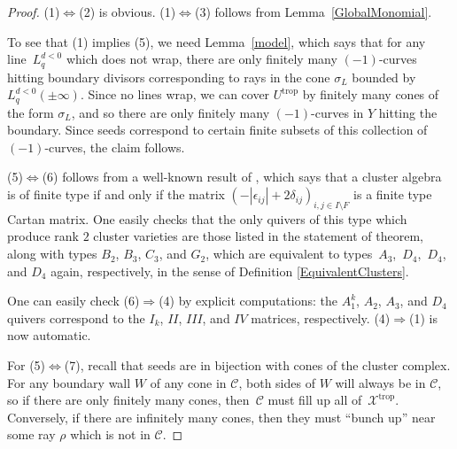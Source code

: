 \documentclass[10pt,a4paper]{amsart}
\numberwithin{equation}{section}
\numberwithin{figure}{section}
\numberwithin{table}{section}
\DeclareMathOperator{\trop}{trop}
\let\s=\mathcal
\theoremstyle{definition}
\begin{document}
\begin{proof}(1)$\Leftrightarrow$(2) is obvious. (1)$\Leftrightarrow$(3) follows from Lemma~\ref{GlobalMonomial}.

To see that (1) implies (5), we need Lemma~\ref{model}, which says that for any line~$L_q^{d<0}$ which does not wrap, there are only finitely many $(-1)$-curves hitting boundary divisors corresponding to rays in the cone $\sigma_{L}$ bounded by $L_q^{d<0}(\pm \infty)$. Since no lines wrap, we can cover $U^{\trop}$ by finitely many cones of the form $\sigma_{L}$, and so there are only finitely many $(-1)$-curves in $Y$ hitting the boundary. Since seeds correspond to certain finite subsets of this collection of $(-1)$-curves, the claim follows.

(5)$\Leftrightarrow$(6) follows from a well-known result of \cite{FZ2}, which says that a cluster algebra is of finite type if and only if the matrix $(-|\epsilon_{ij}|+2\delta_{ij})_{i,j\in I\setminus F}$ is a finite type Cartan matrix. One easily checks that the only quivers of this type which produce rank $2$ cluster varieties are those listed in the statement of theorem, along with types $B_2$, $B_3$, $C_3$, and $G_2$, which are equivalent to types~$A_3$,~$D_4$,~$D_4$, and $D_4$ again, respectively, in the sense of Definition \ref{EquivalentClusters}.

 One can easily check (6)$\Rightarrow$(4) by explicit computations: the $A_1^k$, $A_2$, $A_3$, and $D_4$ quivers correspond to the $I_k$, $II$, $III$, and $IV$ matrices, respectively. (4)$\Rightarrow$(1) is now automatic.

For (5)$\Leftrightarrow$(7), recall that seeds are in bijection with cones of the cluster complex. For any boundary wall $W$ of any cone in $\s{C}$, both sides of $W$ will always be in $\s{C}$, so if there are only finitely many cones, then~$\s{C}$ must fill up all of~$\s{X}^{\trop}$. Conversely, if there are infinitely many cones, then they must ``bunch up'' near some ray $\rho$ which is not in $\s{C}$.
\end{proof}
\end{document}
